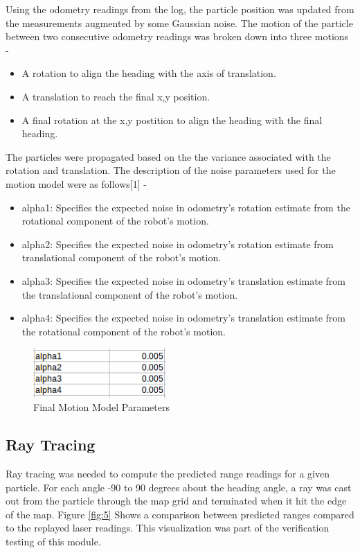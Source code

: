 \documentclass{article}
\begin{document}
Using the odometry readings from the log, the particle position was updated from the measurements augmented by some Gaussian noise. The motion of the particle between two consecutive odometry readings was broken down into three motions - 
\begin{itemize}
\item A rotation to align the heading with the axis of translation.
\item A translation to reach the final x,y position.
\item A final rotation at the x,y postition to align the heading with the final heading.
\end{itemize}

The particles were propagated based on the the variance associated with the rotation and translation. The description of the noise parameters used for the motion model were as follows[1] - 
\begin{itemize}
\item alpha1: Specifies the expected noise in odometry's rotation estimate from the rotational component of the robot's motion. 
\item alpha2: Specifies the expected noise in odometry's rotation estimate from translational component of the robot's motion. 
\item alpha3: Specifies the expected noise in odometry's translation estimate from the translational component of the robot's motion. 
\item alpha4: Specifies the expected noise in odometry's translation estimate from the rotational component of the robot's motion. 
\end{itemize}

\begin{figure}[!h]
    \centering
    \includegraphics[width=2.0in]{media/motion_model_parameters.png}
    \caption{Final Motion Model Parameters}
\label{fig:4}
\end{figure}

\subsection{Ray Tracing}

Ray tracing was needed to compute the predicted range readings for a given particle.  For each angle -90 to 90 degrees about the heading angle, a ray was cast out from the particle through the map grid and terminated when it hit the edge of the map.  Figure \ref{fig:5} Shows a comparison between predicted ranges compared to the replayed laser readings. This visualization was part of the verification testing of this module.
\end{document}
